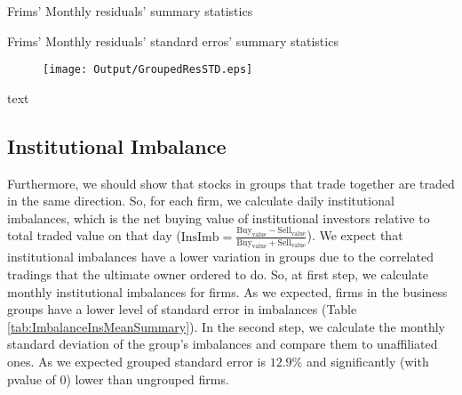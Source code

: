 {			\begin{table}[htbp]
	\centering
	\caption{Frims' Monthly residuals' summary statistics}
	\label{tab:ResidualTrunSummary}
	\resizebox{0.8\textwidth}{!}{
		
	}
\end{table}	
		\begin{table}[htbp]
			\centering
			\caption{Frims' Monthly residuals' standard erros' summary statistics}
			\label{tab:ResidualTrunStdSummary}
			\resizebox{0.8\textwidth}{!}{
				
			}
		\end{table}
\begin{figure}[htbp]
	\centering
	\texttt{[image: Output/GroupedResSTD.eps]}
	\label{fig:GroupedResSTD}
\end{figure}
		\begin{table}[htbp]
			\centering
			\caption{text}
			\label{Turnovercrosssection}
			\resizebox{\textwidth}{!}{
				\centering
				
			}			
		\end{table}}



\FloatBarrier



%
%
\subsection{{Institutional Imbalance}}

	Furthermore, we should show that stocks in groups that trade together are traded in the same direction. So, for each firm, we calculate daily institutional imbalances, which is the net buying value of institutional investors relative to total traded value on that day ($ \text{InsImb} = \frac{\text{Buy}_{\text{value}} - \text{Sell}_{\text{value}}}{\text{Buy}_{\text{value}} + \text{Sell}_{\text{value}}} $).\cite{seasholes2007predictable} 
	We expect that institutional imbalances have a lower variation in groups due to the correlated tradings that the ultimate owner ordered to do. So, at first step, we calculate monthly institutional imbalances for firms. As we expected, firms in the business groups have a lower level of standard error in  imbalances (Table \ref{tab:ImbalanceInsMeanSummary}). In the second step, 	 we calculate the monthly standard deviation of the group's imbalances and compare them to unaffiliated ones. As we expected grouped standard error is  $12.9\%$ and significantly (with pvalue of 0) lower than ungrouped firms. 
	
